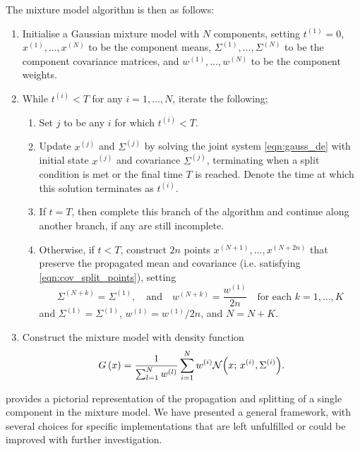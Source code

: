 The mixture model algorithm is then as follows:
\begin{enumerate}
	\item Initialise a Gaussian mixture model with \(N\) components, setting \(t^{(1)} = 0\), \(x^{(1)},\dotsc, x^{(N)}\) to be the component means, \(\Sigma^{(1)}, \dotsc, \Sigma^{(N)}\) to be the component covariance matrices, and \(w^{(1)}, \dotsc, w^{(N)}\) to be the component weights.

	\item While \(t^{(i)} < T\) for any \(i = 1,\dotsc, N\), iterate the following;

	      \begin{enumerate}
		      \item Set \(j\) to be any \(i\) for which \(t^{(i)} < T\).

		      \item Update \(x^{(j)}\) and \(\Sigma^{(j)}\) by solving the joint system \cref{eqn:gauss_de} with initial state \(x^{(j)}\) and covariance \(\Sigma^{(j)}\), terminating when a split condition is met or the final time \(T\) is reached.
		            Denote the time at which this solution terminates as \(t^{(i)}\).

		      \item If \(t = T\), then complete this branch of the algorithm and continue along another branch, if any are still incomplete.

		      \item Otherwise, if \(t < T\), construct \(2n\) points \(x^{(N + 1)},\dotsc,x^{(N + 2n)}\) that preserve the propagated mean and covariance (i.e. satisfying \cref{eqn:cov_split_points}), setting
		            \[
			            \Sigma^{(N + k)} = \Sigma^{(1)}, \quad \text{and} \quad w^{(N + k)} = \frac{w^{(1)}}{2n} \quad \text{for each } k = 1,\dotsc,K
		            \]
		            and \(\Sigma^{(1)} = \Sigma^{(1)}\), \(w^{(1)} = w^{(1)} / 2n\), and \(N = N + K\).
	      \end{enumerate}

	\item Construct the mixture model with density function
	      \[
		      G\left(x\right) = \frac{1}{\sum_{l=1}^{N}w^{(l)}}\sum_{i=1}^{N}{w^{(i)}\mathcal{N}\!\left(x; \, x^{(i)}, \Sigma^{(i)}\right)}.
	      \]

\end{enumerate}
 provides a pictorial representation of the propagation and splitting of a single component in the mixture model.
We have presented a general framework, with several choices for specific implementations that are left unfulfilled or could be improved with further investigation.

